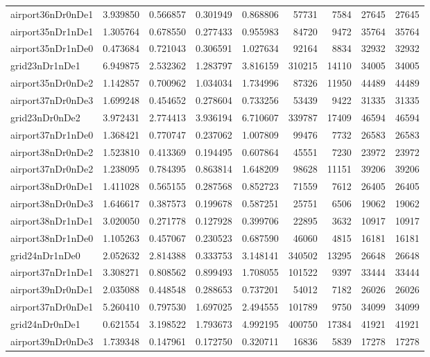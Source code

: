 \begin{longtable}{|l|r|r|r|r|r|r|r|r|}
airport36nDr0nDe1 & 3.939850 & 0.566857 & 0.301949 & 0.868806 & 57731 & 7584 & 27645 & 27645 \\
airport35nDr1nDe1 & 1.305764 & 0.678550 & 0.277433 & 0.955983 & 84720 & 9472 & 35764 & 35764 \\
airport35nDr1nDe0 & 0.473684 & 0.721043 & 0.306591 & 1.027634 & 92164 & 8834 & 32932 & 32932 \\
grid23nDr1nDe1 & 6.949875 & 2.532362 & 1.283797 & 3.816159 & 310215 & 14110 & 34005 & 34005 \\
airport35nDr0nDe2 & 1.142857 & 0.700962 & 1.034034 & 1.734996 & 87326 & 11950 & 44489 & 44489 \\
airport37nDr0nDe3 & 1.699248 & 0.454652 & 0.278604 & 0.733256 & 53439 & 9422 & 31335 & 31335 \\
grid23nDr0nDe2 & 3.972431 & 2.774413 & 3.936194 & 6.710607 & 339787 & 17409 & 46594 & 46594 \\
airport37nDr1nDe0 & 1.368421 & 0.770747 & 0.237062 & 1.007809 & 99476 & 7732 & 26583 & 26583 \\
airport38nDr0nDe2 & 1.523810 & 0.413369 & 0.194495 & 0.607864 & 45551 & 7230 & 23972 & 23972 \\
airport37nDr0nDe2 & 1.238095 & 0.784395 & 0.863814 & 1.648209 & 98628 & 11151 & 39206 & 39206 \\
airport38nDr0nDe1 & 1.411028 & 0.565155 & 0.287568 & 0.852723 & 71559 & 7612 & 26405 & 26405 \\
airport38nDr0nDe3 & 1.646617 & 0.387573 & 0.199678 & 0.587251 & 25751 & 6506 & 19062 & 19062 \\
airport38nDr1nDe1 & 3.020050 & 0.271778 & 0.127928 & 0.399706 & 22895 & 3632 & 10917 & 10917 \\
airport38nDr1nDe0 & 1.105263 & 0.457067 & 0.230523 & 0.687590 & 46060 & 4815 & 16181 & 16181 \\
grid24nDr1nDe0 & 2.052632 & 2.814388 & 0.333753 & 3.148141 & 340502 & 13295 & 26648 & 26648 \\
airport37nDr1nDe1 & 3.308271 & 0.808562 & 0.899493 & 1.708055 & 101522 & 9397 & 33444 & 33444 \\
airport39nDr0nDe1 & 2.035088 & 0.448548 & 0.288653 & 0.737201 & 54012 & 7182 & 26026 & 26026 \\
airport37nDr0nDe1 & 5.260410 & 0.797530 & 1.697025 & 2.494555 & 101789 & 9750 & 34099 & 34099 \\
grid24nDr0nDe1 & 0.621554 & 3.198522 & 1.793673 & 4.992195 & 400750 & 17384 & 41921 & 41921 \\
airport39nDr0nDe3 & 1.739348 & 0.147961 & 0.172750 & 0.320711 & 16836 & 5839 & 17278 & 17278 \\

\end{longtable}
